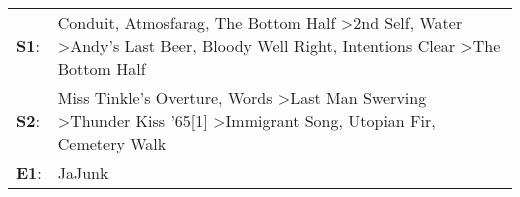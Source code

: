 \begin{supertabular}{p{0.03\textwidth}p{0.92\textwidth}}
 \textbf{S1}:  &  Conduit\textsuperscript{}, \enspace Atmosfarag\textsuperscript{}, \enspace The Bottom Half\textsuperscript{} \textgreater \enspace 2nd Self\textsuperscript{}, \enspace Water\textsuperscript{} \textgreater \enspace Andy's Last Beer\textsuperscript{}, \enspace Bloody Well Right\textsuperscript{}, \enspace Intentions Clear\textsuperscript{} \textgreater \enspace The Bottom Half\textsuperscript{}  \enspace  \\
 \textbf{S2}:  &                                                                    Miss Tinkle's Overture\textsuperscript{}, \enspace Words\textsuperscript{} \textgreater \enspace Last Man Swerving\textsuperscript{} \textgreater \enspace Thunder Kiss '65[1]\textsuperscript{} \textgreater \enspace Immigrant Song\textsuperscript{}, \enspace Utopian Fir\textsuperscript{}, \enspace Cemetery Walk\textsuperscript{}  \enspace  \\
 \textbf{E1}:  &                                                                                                                                                                                                                                                                                                                                                                                     JaJunk\textsuperscript{}  \enspace  \\
\end{supertabular}

